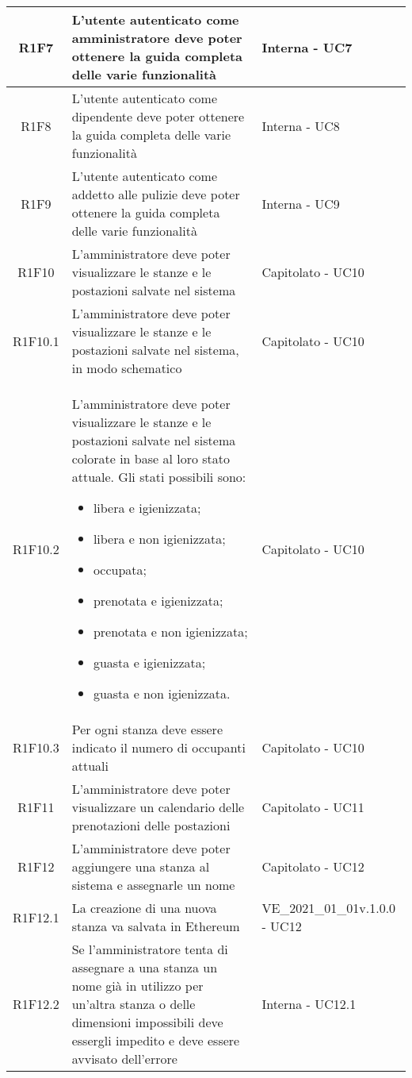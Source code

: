 \begin{center}
\begin{longtable}{|c|p{10cm}|p{4cm}|}
		\hline
		R1F7	&	L'utente autenticato come amministratore deve poter ottenere la guida completa delle varie funzionalità& Interna - UC7	\\
		\hline
		R1F8	&	L'utente autenticato come dipendente deve poter ottenere la guida completa delle varie funzionalità& Interna - UC8	\\
		\hline
		R1F9	&	L'utente autenticato come addetto alle pulizie deve poter ottenere la guida completa delle varie funzionalità& Interna - UC9	\\
		\hline
		R1F10&L'amministratore deve poter visualizzare le stanze e le postazioni salvate nel sistema& Capitolato - UC10	\\
		\hline
		R1F10.1&L'amministratore deve poter visualizzare le stanze e le postazioni salvate nel sistema, in modo schematico& Capitolato - UC10	\\
		\hline
		R1F10.2&L'amministratore deve poter visualizzare le stanze e le postazioni salvate nel sistema colorate in base al loro stato attuale. Gli stati possibili sono:
		\begin{itemize}
			\item libera e igienizzata;
			\item libera e non igienizzata;
			\item occupata;
			\item prenotata e igienizzata;
			\item prenotata e non igienizzata;
			\item guasta e igienizzata;
			\item guasta e non igienizzata.
		\end{itemize}& Capitolato - UC10	\\
		\hline
		R1F10.3&Per ogni stanza deve essere indicato il numero di occupanti attuali	& Capitolato - UC10	\\
		\hline
		R1F11&L'amministratore deve poter visualizzare un calendario delle prenotazioni delle postazioni	& Capitolato - UC11	\\
		\hline
		R1F12&L'amministratore deve poter aggiungere una stanza al sistema e assegnarle un nome	& Capitolato - UC12	\\
		\hline
		R1F12.1&	La creazione di una nuova stanza va salvata in Ethereum&VE\_2021\_01\_01v.1.0.0 - UC12 	\\
		\hline
		R1F12.2 & Se l'amministratore tenta di assegnare a una stanza un nome già in utilizzo per un'altra stanza o delle dimensioni impossibili deve essergli impedito e deve essere avvisato dell'errore & Interna - UC12.1 \\

\end{longtable}
\end{center}
